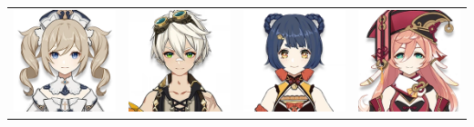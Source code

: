 \documentclass[11pt]{article}
\begin{document}
\begin{center}
    \begin{tabular}{m{} m{} m{} m{}}
        \includegraphics[scale = 0.25]{Character_Barbara.png}  & \includegraphics[scale = 0.25]{Character_Bennett.png} &  \includegraphics[scale = 0.25]{Character_Xiangling.png} & \includegraphics[scale = 0.25]{Character_Yanfei.png}\\
    \end{tabular}
\end{center} 
\end{document}
